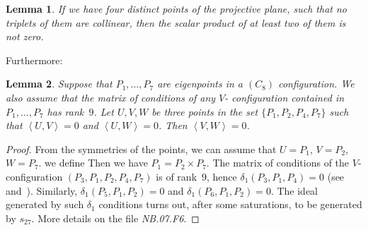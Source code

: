 \documentclass[a4paper, 11pt, reqno]{amsart}
\theoremstyle{plain}
\newtheorem{lemma}{Lemma}[section]
\theoremstyle{definition}
\newcommand{\nb}[2]{\textsl{{NB}.{#1}.{#2}}}
\newcommand{\scl}[2]{\left\langle {#1}, {#2} \right\rangle}
\begin{document}
\begin{lemma}
\label{lemma:6ortog} 
If we have four distinct points of the projective
plane, such that no triplets of them are collinear, then the scalar 
product of at least two of them is not zero.
\end{lemma}

Furthermore:

\begin{lemma}
\label{lemma:three_s_zero}
Suppose that $P_1, \dotsc, P_7$ are eigenpoints in a $(C_8)$ configuration.
We also assume that the matrix of conditions of any $V$- configuration contained in $P_1, \dotsc, P_7$ has rank~$9$. 
Let $U, V, W$ be three points in the set $\{P_1, P_2, P_4, P_7\}$
such that $\scl{U}{V} = 0$ and $\scl{U}{W} = 0$.
Then $\scl{V}{W} = 0$.
\end{lemma}
\begin{proof}
From the symmetries of the points, we can assume that $U=P_1$, $V=P_2$, $W=P_7$.
we define 
Then we have $P_1 = P_2 \times P_7$. 
The matrix of conditions of the $V$- configuration 
$(P_3, P_1, P_2, P_4, P_7)$ 
is of rank~$9$, hence $\delta_1(P_3, P_1, P_4) = 0$ 
(see~ and~). 
Similarly, $\delta_1(P_5, P_1, P_2) = 0$ and $\delta_1(P_6, P_1, P_2) = 0$. 
The ideal generated by such
$\delta_1$ conditions turns out, 
after some saturations, to be generated by $s_{27}$.
More details on the file \nb{07}{F6}.
\end{proof}
\end{document}
